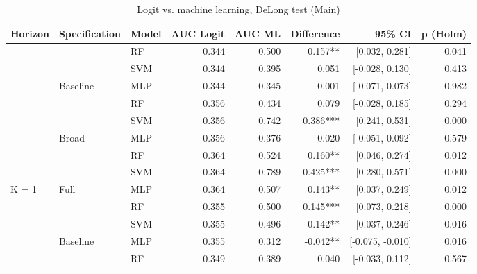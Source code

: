 \begin{table}

\caption{\label{tab:delong_main}Logit vs. machine learning, DeLong test (Main)}
\centering
\begin{threeparttable}
\begin{tabular}[t]{lllrrrrr}
\toprule
Horizon & Specification & Model & AUC Logit & AUC ML & Difference & 95\% CI & p (Holm)\\
\midrule
 &  & RF & 0.344 & 0.500 & 0.157** & {}[0.032, 0.281] & 0.041\\

 &  & SVM & 0.344 & 0.395 & 0.051 & {}[-0.028, 0.130] & 0.413\\

 & \multirow[t]{-2}{*}[\normalbaselineskip]{\raggedright\arraybackslash Baseline} & MLP & 0.344 & 0.345 & 0.001 & {}[-0.071, 0.073] & 0.982\\

 &  & RF & 0.356 & 0.434 & 0.079 & {}[-0.028, 0.185] & 0.294\\

 &  & SVM & 0.356 & 0.742 & 0.386*** & {}[0.241, 0.531] & 0.000\\

 & \multirow[t]{-2}{*}[\normalbaselineskip]{\raggedright\arraybackslash Broad} & MLP & 0.356 & 0.376 & 0.020 & {}[-0.051, 0.092] & 0.579\\

 &  & RF & 0.364 & 0.524 & 0.160** & {}[0.046, 0.274] & 0.012\\

 &  & SVM & 0.364 & 0.789 & 0.425*** & {}[0.280, 0.571] & 0.000\\

\multirow[t]{-8}{*}[\normalbaselineskip]{\raggedright\arraybackslash K = 1} & \multirow[t]{-2}{*}[\normalbaselineskip]{\raggedright\arraybackslash Full} & MLP & 0.364 & 0.507 & 0.143** & {}[0.037, 0.249] & 0.012\\
\cmidrule{1-8}
 &  & RF & 0.355 & 0.500 & 0.145*** & {}[0.073, 0.218] & 0.000\\

 &  & SVM & 0.355 & 0.496 & 0.142** & {}[0.037, 0.246] & 0.016\\

 & \multirow[t]{-2}{*}[\normalbaselineskip]{\raggedright\arraybackslash Baseline} & MLP & 0.355 & 0.312 & -0.042** & {}[-0.075, -0.010] & 0.016\\

 &  & RF & 0.349 & 0.389 & 0.040 & {}[-0.033, 0.112] & 0.567\\


\end{tabular}
\end{threeparttable}
\end{table}
